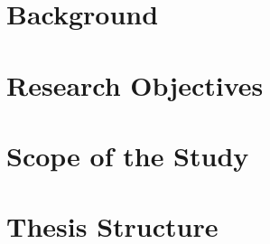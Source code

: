 \section{Background}

\section{Research Objectives}

\section{Scope of the Study}

\section{Thesis Structure}
